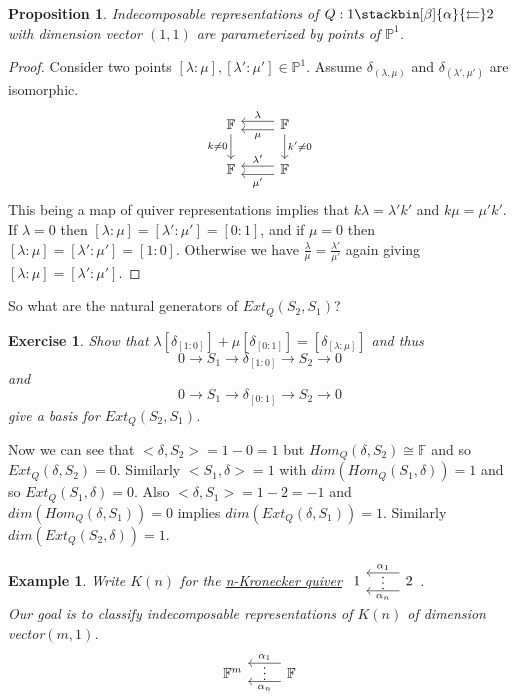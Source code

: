 \documentclass{book}
\newtheorem{prop}[theorem]{Proposition}
\newtheorem{example}{Example}[section]
\newtheorem {exercise}[theorem] {Exercise}
\begin{document}
		\begin{prop}
			Indecomposable representations of $Q : 1 \stackbin[\beta]{\alpha}{\leftleftarrows} 2$ with dimension vector $(1,1)$ are parameterized by points of $\mathbb{P}^1$.
		\end{prop}
		\begin{proof}
			Consider two points $[\lambda:\mu] ,[\lambda ' : \mu '] \in \mathbb{P}^1$. Assume $\delta_{(\lambda,\mu)}$ and $\delta_{(\lambda ',\mu ')}$ 				are isomorphic.
			\[ \begin{tikzcd}
			\mathbb{F} \arrow[d, "k \neq 0" '] &  \arrow[l, "\lambda"',yshift=0.7ex] \arrow[l,"\mu",yshift=-0.7ex]  \mathbb{F} \arrow{d}{k ' \neq 0}  \\
			\mathbb{F}  &  \arrow[l, "\lambda ' "',yshift=0.7ex] \arrow[l,"\mu ' ",yshift=-0.7ex]  \mathbb{F}
			\end{tikzcd}\]
			This being a map of quiver representations implies that $k \lambda = \lambda ' k'$ and $k\mu =\mu ' k'$.
			If $\lambda = 0$ then $[\lambda:\mu] =[\lambda ' : \mu ']=[0:1]$, and if  $\mu = 0$ then $[\lambda:\mu] =[\lambda ' : \mu ']=[1:0]$.
			Otherwise we have $\frac{\lambda}{\mu} = \frac{\lambda'}{\mu'}$ again giving $[\lambda:\mu] =[\lambda ' : \mu ']$.
		\end{proof}
		So what are the natural generators of $Ext_Q(S_2,S_1)$?
		\begin{exercise}
			Show that $\lambda [\delta_{[1:0]}] + \mu [\delta_{[0:1]}] =[\delta_{[\lambda:\mu]}]  $ and thus $$ 0 \rightarrow S_1 \rightarrow \delta_{[1:0]} \rightarrow S_2 \rightarrow 0$$ and $$ 0 \rightarrow S_1 \rightarrow \delta_{[0:1]} \rightarrow S_2 \rightarrow 0$$ give a basis for $Ext_Q(S_2,S_1)$.
		\end{exercise}
		Now we can see that $<\delta,S_2>=1-0=1$ but $Hom_Q(\delta,S_2) \cong \mathbb{F}$ and so $Ext_Q(\delta,S_2)=0$.
		Similarly $<S_1,\delta>=1$ with $dim(Hom_Q(S_1,\delta)) =1$ and so $Ext_Q(S_1,\delta)=0$. Also $<\delta,S_1>=1-2=-1$ and $dim(Hom_Q(\delta,S_1)) =0$ implies  $dim(Ext_Q(\delta,S_1))=1$. Similarly $dim(Ext_Q(S_2,\delta))=1$.

		\begin{example}
			Write $K(n)$ for the \underline{n-Kronecker quiver} $ \begin{tikzcd}
			1  &   \arrow[l, "\alpha_1"',yshift=1.5ex]  \arrow[l, phantom, "{\vdots}"',yshift=.5ex]     \arrow[l,"\alpha_n",yshift=-1.5ex] 2
			\end{tikzcd} $.\\ 
			Our goal is to classify indecomposable representations of $K(n)$ of dimension vector$(m,1)$.
			\[ \begin{tikzcd}
			\mathbb{F}^m  &   \arrow[l, "\alpha_1"',yshift=1.8ex]  \arrow[l, phantom, "{\vdots}"',yshift=0.8ex]     \arrow[l,"\alpha_n",yshift=-1.2ex] \mathbb{F}
			\end{tikzcd} \]
		\end{example}
		
\end{document}
